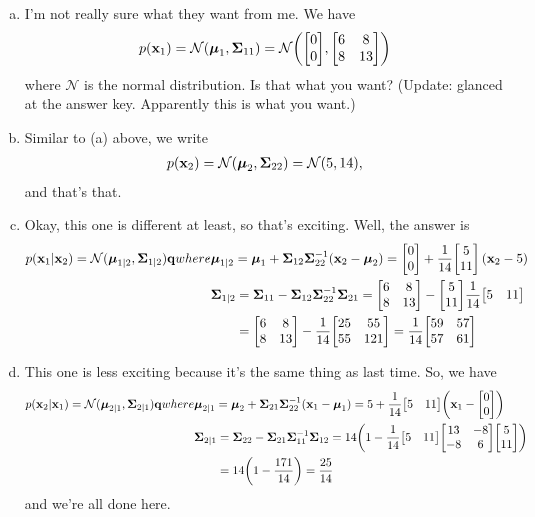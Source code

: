 \documentclass[12pt,letterpaper,fleqn]{hmcpset}
\begin{document}
\begin{solution}
\begin{enumerate}[(a)]
    \item I'm not really sure what they want from me. We have 
    \begin{align*}
        p(\vb x_1) = \mathcal N (\mub_1, \Sigmab_{11}) = \mathcal N \qty( \mqty[0\\0], \mqty[6 & 8\\8&13])
    \end{align*}
    where $\mathcal N $ is the normal distribution. Is that what you want? (Update: glanced at the answer key. Apparently this is what you want.)

    \item Similar to (a) above, we write
    \begin{align*}
        p(\vb x_2) = \mathcal N (\hbox{\boldmath$\mu$}_2, \hbox{\boldmath$\Sigma$}_{22}) = \mathcal N (5, 14),
    \end{align*}
    and that's that.

    \item Okay, this one is different at least, so that's exciting. Well, the answer is
    \begin{align*}
        p(\vb x_1 | \vb x_2) = \mathcal N(\mub_{1|2}, \Sigmab_{1|2}) \qq{where} 
        &\mub_{1|2} = \mub_1 + \Sigmab_{12}\Sigmab_{22}^{-1}(\vb x_2 - \mub_2)  = \mqty[0\\0] + \frac{1}{14}\mqty[5\\11](\vb x_2 - 5) \\
        &\Sigmab_{1|2} = \Sigmab_{11} - \Sigmab_{12} \Sigmab_{22}^{-1} \Sigmab_{21} = \mqty[6 & 8\\8&13] - \mqty[5\\11] \frac{1}{14} \mqty[5 & 11 ]\\ 
        &\phantom{\Sigmab_{1|2}}=\mqty[6 & 8\\8&13]  - \frac{1}{14}\mqty[25 & 55 \\55 & 121] = \frac1{14}\mqty[ 59 & 57 \\
 57 & 61 ]
    \end{align*}

    \item This one is less exciting because it's the same thing as last time. So, we have
    \begin{align*}
        p(\vb x_2 | \vb x_1) = \mathcal N(\mub_{2|1}, \Sigmab_{2|1}) \qq{where} 
        &\mub_{2|1} = \mub_2 + \Sigmab_{21}\Sigmab_{22}^{-1}(\vb x_1 - \mub_1) = 
    5 + \frac{1}{14}\mqty[5&11]\qty(\vb x_1 - \mqty[0\\0])
         \\
         &\Sigmab_{2|1} = \Sigmab_{22} - \Sigmab_{21} \Sigmab_{11}^{-1} \Sigmab_{12} 
         = 14\qty(1 - \frac{1}{14}\mqty[5&11]\mqty[13 & -8 \\
 -8 & 6] \mqty[5\\11] ) \\
 &\phantom{\Sigmab_{2|1}} = 14\qty( 1 - \frac{171}{14}) = \frac{25}{14}
    \end{align*}
    and we're all done here.
\end{enumerate}
\end{solution}
\newpage
\end{document}
